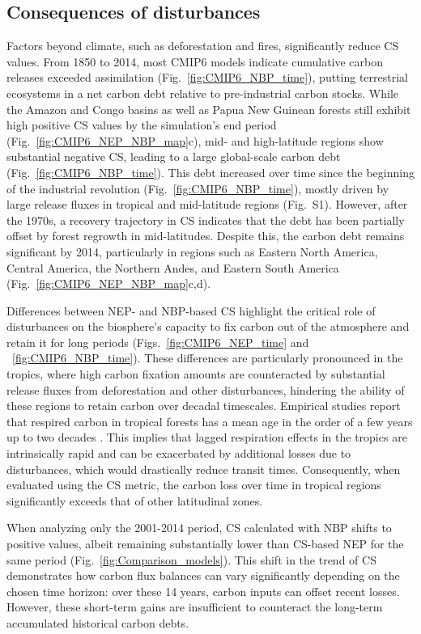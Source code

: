 \documentclass[9pt,twocolumn,twoside]{pnas-new}
\begin{document}
\subsection*{Consequences of disturbances}
Factors beyond climate, such as deforestation and fires, significantly reduce CS values. From 1850 to 2014, most CMIP6 models indicate cumulative carbon releases exceeded assimilation (Fig.~\ref{fig:CMIP6_NBP_time}), putting terrestrial ecosystems in a net carbon debt relative to pre-industrial carbon stocks. While the Amazon and Congo basins as well as Papua New Guinean forests still exhibit high positive CS values by the simulation's end period (Fig.~\ref{fig:CMIP6_NEP_NBP_map}c), mid- and high-latitude regions show substantial negative CS, leading to a large global-scale carbon debt (Fig.~\ref{fig:CMIP6_NBP_time}). This debt increased over time since the beginning of the industrial revolution (Fig.~\ref{fig:CMIP6_NBP_time}), mostly driven by large release fluxes in tropical and mid-latitude regions (Fig.~S1). However, after the 1970s, a recovery trajectory in CS indicates that the debt has been partially offset by forest regrowth in mid-latitudes. Despite this, the carbon debt remains significant by 2014, particularly in regions such as Eastern North America, Central America, the Northern Andes, and Eastern South America (Fig.~\ref{fig:CMIP6_NEP_NBP_map}c,d). 

Differences between NEP- and NBP-based CS highlight the critical role of disturbances on the biosphere's capacity to fix carbon out of the atmosphere and retain it for long periods (Figs.~\ref{fig:CMIP6_NEP_time} and ~\ref{fig:CMIP6_NBP_time}). These differences are particularly pronounced in the tropics, where high carbon fixation amounts are counteracted by substantial release fluxes from deforestation and other disturbances, hindering the ability of these regions to retain carbon over decadal timescales. Empirical studies report that respired carbon in tropical forests has a mean age in the order of a few years up to two decades \cite{Sierra2021JE,Chanca2025}. This implies that lagged respiration effects in the tropics are intrinsically rapid and can be exacerbated by additional losses due to disturbances, which would drastically reduce transit times. Consequently, when evaluated using the CS metric, the carbon loss over time in tropical regions significantly exceeds that of other latitudinal zones. 

When analyzing only the 2001-2014 period, CS calculated with NBP shifts to positive values, albeit remaining substantially lower than CS-based NEP for the same period (Fig.~\ref{fig:Comparison_models}). This shift in the trend of CS demonstrates how carbon flux balances can vary significantly depending on the chosen time horizon: over these 14 years, carbon inputs can offset recent losses. However, these short-term gains are insufficient to counteract the long-term accumulated historical carbon debts. 
\end{document}
